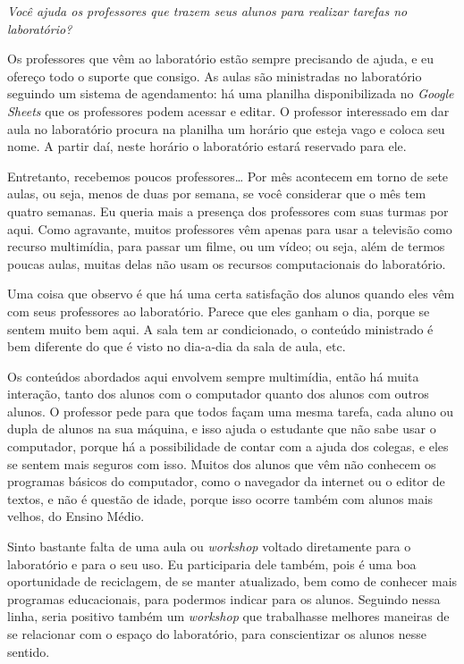 \textit{Você ajuda os professores que trazem seus alunos para realizar tarefas no laboratório?}

Os professores que vêm ao laboratório estão sempre precisando de ajuda, e eu ofereço todo o suporte que consigo. As aulas são ministradas no laboratório seguindo um sistema de agendamento: há uma planilha disponibilizada no \textit{Google Sheets} que os professores podem acessar e editar. O professor interessado em dar aula no laboratório procura na planilha um horário que esteja vago e coloca seu nome. A partir daí, neste horário o laboratório estará reservado para ele.

Entretanto, recebemos poucos professores… Por mês acontecem em torno de sete aulas, ou seja, menos de duas por semana, se você considerar que o mês tem quatro semanas. Eu queria mais a presença dos professores com suas turmas por aqui. Como agravante, muitos professores vêm apenas para usar a televisão como recurso multimídia, para passar um filme, ou um vídeo; ou seja, além de termos poucas aulas, muitas delas não usam os recursos computacionais do laboratório.

Uma coisa que observo é que há uma certa satisfação dos alunos quando eles vêm com seus professores ao laboratório. Parece que eles ganham o dia, porque se sentem muito bem aqui. A sala tem ar condicionado, o conteúdo ministrado é bem diferente do que é visto no dia-a-dia da sala de aula, etc.

Os conteúdos abordados aqui envolvem sempre multimídia, então há muita interação, tanto dos alunos com o computador quanto dos alunos com outros alunos. O professor pede para que todos façam uma mesma tarefa, cada aluno ou dupla de alunos na sua máquina, e isso ajuda o estudante que não sabe usar o computador, porque há a possibilidade de contar com a ajuda dos colegas, e eles se sentem mais seguros com isso. Muitos dos alunos que vêm não conhecem os programas básicos do computador, como o navegador da internet ou o editor de textos, e não é questão de idade, porque isso ocorre também com alunos mais velhos, do Ensino Médio.

Sinto bastante falta de uma aula ou \textit{workshop} voltado diretamente para o laboratório e para o seu uso. Eu participaria dele também, pois é uma boa oportunidade de reciclagem, de se manter atualizado, bem como de conhecer mais programas educacionais, para podermos indicar para os alunos. Seguindo nessa linha, seria positivo também um \textit{workshop} que trabalhasse melhores maneiras de se relacionar com o espaço do laboratório, para conscientizar os alunos nesse sentido.

